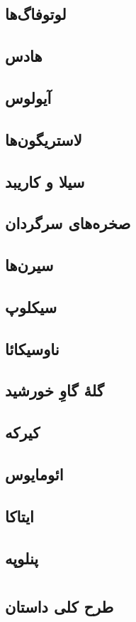 \documentclass[12pt,onecolumn,a4paper]{book}
\begin{document}
    \chapter{لوتوفاگ‌ها}
    \chapter{هادس}
    \chapter{آیولوس}
    \chapter{لاستریگون‌ها}
    \chapter{سیلا و کاریبد}
    \chapter{صخره‌های سرگردان}
    \chapter{سیرن‌ها}
    \chapter{سیکلوپ}
    \chapter{ناوسیکائا}
    \chapter{گلۀ گاوِ خورشید}
    \chapter{کیرکه}
    \chapter{ائومایوس}
    \chapter{ایتاکا}
    \chapter{پنلوپه}

    \part{}
    \chapter{طرح کلی داستان}

    \part{}
    \clearpage
    \printglossary[title={واژه‌نامه},toctitle={واژه‌نامه}]
\end{document}

